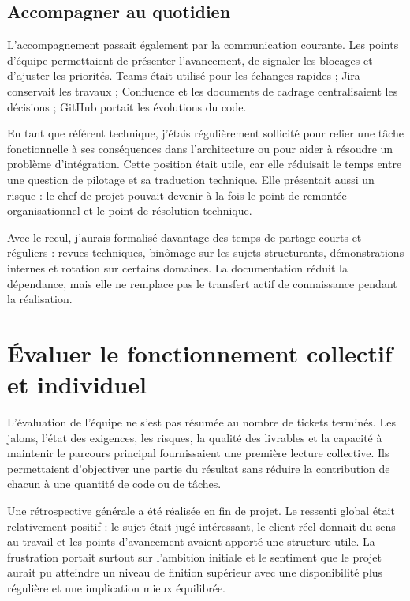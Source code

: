 \subsection{Accompagner au quotidien}

L'accompagnement passait également par la communication courante. Les points d'équipe permettaient de présenter l'avancement, de signaler les blocages et d'ajuster les priorités. Teams était utilisé pour les échanges rapides ; Jira conservait les travaux ; Confluence et les documents de cadrage centralisaient les décisions ; GitHub portait les évolutions du code.

En tant que référent technique, j'étais régulièrement sollicité pour relier une tâche fonctionnelle à ses conséquences dans l'architecture ou pour aider à résoudre un problème d'intégration. Cette position était utile, car elle réduisait le temps entre une question de pilotage et sa traduction technique. Elle présentait aussi un risque : le chef de projet pouvait devenir à la fois le point de remontée organisationnel et le point de résolution technique.

Avec le recul, j'aurais formalisé davantage des temps de partage courts et réguliers : revues techniques, binômage sur les sujets structurants, démonstrations internes et rotation sur certains domaines. La documentation réduit la dépendance, mais elle ne remplace pas le transfert actif de connaissance pendant la réalisation.

\section{Évaluer le fonctionnement collectif et individuel}

L'évaluation de l'équipe ne s'est pas résumée au nombre de tickets terminés. Les jalons, l'état des exigences, les risques, la qualité des livrables et la capacité à maintenir le parcours principal fournissaient une première lecture collective. Ils permettaient d'objectiver une partie du résultat sans réduire la contribution de chacun à une quantité de code ou de tâches.

Une rétrospective générale a été réalisée en fin de projet. Le ressenti global était relativement positif : le sujet était jugé intéressant, le client réel donnait du sens au travail et les points d'avancement avaient apporté une structure utile. La frustration portait surtout sur l'ambition initiale et le sentiment que le projet aurait pu atteindre un niveau de finition supérieur avec une disponibilité plus régulière et une implication mieux équilibrée.

